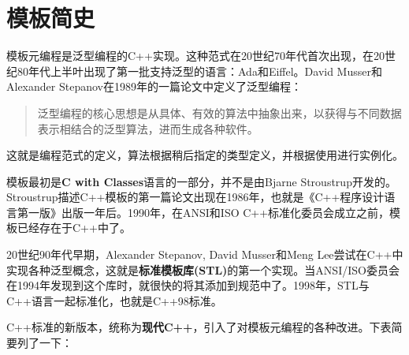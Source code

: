 \section{模板简史}
模板元编程是泛型编程的C++实现。这种范式在20世纪70年代首次出现，在20世纪80年代上半叶出现了第一批支持泛型的语言：Ada和Eiffel。David Musser和Alexander Stepanov在1989年的一篇论文中定义了泛型编程：

\begin{quote}
  泛型编程的核心思想是从具体、有效的算法中抽象出来，以获得与不同数据表示相结合的泛型算法，进而生成各种软件。
\end{quote}

这就是编程范式的定义，算法根据稍后指定的类型定义，并根据使用进行实例化。

模板最初是\textbf{C with Classes}语言的一部分，并不是由Bjarne Stroustrup开发的。Stroustrup描述C++模板的第一篇论文出现在1986年，也就是《C++程序设计语言第一版》出版一年后。1990年，在ANSI和ISO C++标准化委员会成立之前，模板已经存在于C++中了。

20世纪90年代早期，Alexander Stepanov, David Musser和Meng Lee尝试在C++中实现各种泛型概念，这就是\textbf{标准模板库(STL)}的第一个实现。当ANSI/ISO委员会在1994年发现到这个库时，就很快的将其添加到规范中了。1998年，STL与C++语言一起标准化，也就是C++98标准。

C++标准的新版本，统称为\textbf{现代C++}，引入了对模板元编程的各种改进。下表简要列了一下：

